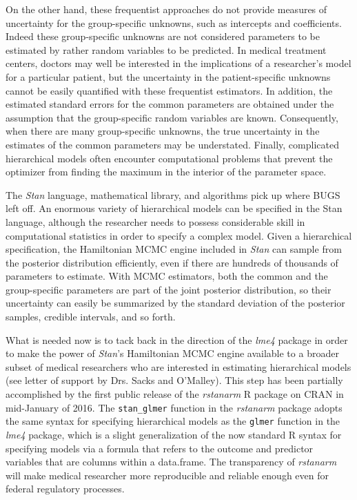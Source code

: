 \documentclass[11pt,notitlepage]{article}
\begin{document}
On the other hand, these frequentist approaches do not provide measures of uncertainty for the
group-specific unknowns, such as intercepts and coefficients. Indeed these group-specific
unknowns are not considered parameters to be estimated by rather random variables to be
predicted. In medical treatment centers, doctors may well be interested in the implications
of a researcher's model for a particular patient, but the uncertainty in the patient-specific
unknowns cannot be easily quantified with these frequentist estimators. In addition, the 
estimated standard errors for the common parameters are obtained under the assumption that
the group-specific random variables are known. Consequently, when there are many group-specific
unknowns, the true uncertainty in the estimates of the common parameters may be understated. 
Finally, complicated hierarchical models often encounter computational problems that prevent
the optimizer from finding the maximum in the interior of the parameter space.

The \textit{Stan} language, mathematical library, and algorithms pick up where BUGS left off.
An enormous variety of hierarchical models can be specified in the Stan language, although the
researcher needs to possess considerable skill in computational statistics in order to specify
a complex model. Given a hierarchical specification, the Hamiltonian MCMC engine included in \textit{Stan}
can sample from the posterior distribution efficiently, even if there are hundreds of thousands
of parameters to estimate. With MCMC estimators, both the common and the group-specific parameters
are part of the joint posterior distribution, so their uncertainty can easily be summarized by
the standard deviation of the posterior samples, credible intervals, and so forth.

What is needed now is to tack back in the direction of the \textit{lme4} package in order to
make the power of \textit{Stan}'s Hamiltonian MCMC engine available to a broader subset of medical
researchers who are interested in estimating hierarchical models (see letter of support 
by Drs. Sacks and O'Malley). This step has been partially accomplished
by the first public release of the \textit{rstanarm} R package on CRAN in mid-January of 2016. The 
\texttt{stan\_glmer} function in the \textit{rstanarm} package adopts the same syntax for specifying hierarchical
models as the \texttt{glmer} function in the \textit{lme4} package, which is a slight generalization
of the now standard R syntax for specifying models via a formula that refers to the outcome and 
predictor variables that are columns within a data.frame. The transparency of \textit{rstanarm} will 
make medical researcher more reproducible and reliable enough even for federal regulatory processes. 
\end{document}
